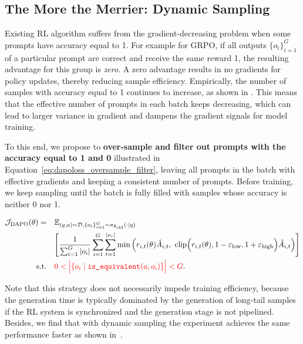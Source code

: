 \subsection{The More the Merrier: Dynamic Sampling}
\label{sec:gradientkeeping}

Existing RL algorithm suffers from the gradient-decreasing problem when some prompts have accuracy equal to 1. For example for GRPO, if all outputs $\{o_i\}_{i=1}^G$ of a particular prompt are correct and receive the same reward 1, the resulting advantage for this group is \textit{zero}. A zero advantage results in no gradients for policy updates, thereby reducing sample efficiency. Empirically, the number of samples with accuracy equal to 1 continues to increase, as shown in . This means that the effective number of prompts in each batch keeps decreasing, which can lead to larger variance in gradient and dampens the gradient signals for model training.

To this end, we propose to \textbf{over-sample and filter out prompts with the accuracy equal to 1 and 0} illustrated in Equation~\ref{eq:dapoloss_oversample_filter}, leaving all prompts in the batch with effective gradients and keeping a consistent number of prompts. Before training, we keep sampling until the batch is fully filled with samples whose accuracy is neither 0 nor 1.

\begin{equation}
\begin{aligned}
\mathcal{J}_{\text{DAPO}}(\theta) =\quad& \mathbb{E}_{(q,a)\sim \mathcal{D}, \{o_i\}_{i=1}^G\sim \pi_{\theta_\text{old}}(\cdot\mid q)}\\&
\Bigg[\frac{1}{\sum_{i=1}^{G}|o_i|}\sum_{i=1}^{G}\sum_{t=1}^{|o_i|} 
\min \Big( r_{i,t}(\theta) \hat{A}_{i,t},  
\ \text{clip} \Big( r_{i,t}(\theta), 1 - {\varepsilon_{\text{low}}}, 1 + {\varepsilon_{\text{high}}} \Big) \hat{A}_{i,t} \Big) \Bigg]
\\
\text{s.t.}\quad& {\color{red}0< \Big|\{o_i\mid\texttt{is\_equivalent}(a,o_i)\}\Big|< G}.
\label{eq:dapoloss_oversample_filter}
\end{aligned}
\end{equation}

Note that this strategy does not necessarily impede training efficiency, because the generation time is typically dominated by the generation of long-tail samples if the RL system is synchronized and the generation stage is not pipelined. Besides, we find that with dynamic sampling the experiment achieves the same performance faster as shown in~.

